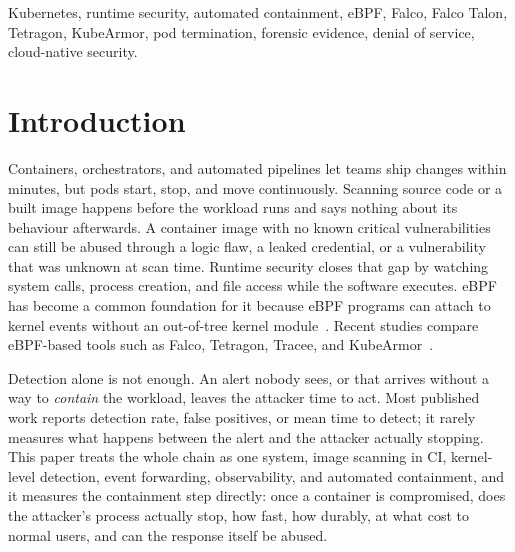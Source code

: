 \documentclass[10pt,conference]{IEEEtran}
\begin{document}
\begin{IEEEkeywords}
Kubernetes, runtime security, automated containment, eBPF, Falco, Falco Talon, Tetragon, KubeArmor, pod termination, forensic evidence, denial of service, cloud-native security.
\end{IEEEkeywords}

\section{Introduction}
Containers, orchestrators, and automated pipelines let teams ship changes within minutes, but pods start, stop, and move continuously. Scanning source code or a built image happens before the workload runs and says nothing about its behaviour afterwards. A container image with no known critical vulnerabilities can still be abused through a logic flaw, a leaked credential, or a vulnerability that was unknown at scan time. Runtime security closes that gap by watching system calls, process creation, and file access while the software executes. eBPF has become a common foundation for it because eBPF programs can attach to kernel events without an out-of-tree kernel module~\cite{ebpf}. Recent studies compare eBPF-based tools such as Falco, Tetragon, Tracee, and KubeArmor~\cite{her2025,syairozi2025}.

Detection alone is not enough. An alert nobody sees, or that arrives without a way to \emph{contain} the workload, leaves the attacker time to act. Most published work reports detection rate, false positives, or mean time to detect; it rarely measures what happens between the alert and the attacker actually stopping. This paper treats the whole chain as one system, image scanning in CI, kernel-level detection, event forwarding, observability, and automated containment, and it measures the containment step directly: once a container is compromised, does the attacker's process actually stop, how fast, how durably, at what cost to normal users, and can the response itself be abused.
\end{document}
